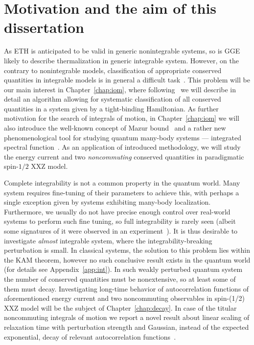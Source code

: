 \section{Motivation and the aim of this dissertation}
As ETH is anticipated to be valid in generic
nonintegrable systems, so is GGE likely to describe thermalization in generic integrable system.
However, on the contrary to nonintegrable models, classification of appropriate 
conserved quantities in integrable models is in general a difficult task~\autocite{DAlessio2016}.
This problem will be our main interest in Chapter~\ref{chap:iom}, where 
following~\textcite{Mierzejewski2015a} we will describe in detail an algorithm allowing for
systematic classification of all conserved quantities in a system given by a tight-binding
Hamiltonian. As further motivation for the search of integrals of motion, in
Chapter~\ref{chap:iom} we will also introduce the well-known concept of Mazur 
bound~\autocite{Mazur1969,Suzuki1971} and a rather new phenomenological tool for studying
quantum many-body systems --- integrated spectral function~\autocite{Vidmar2021}. 
As an application of introduced methodology, we will study the energy current and
two \textit{noncommuting} conserved quantities in paradigmatic spin-\(1/2\) XXZ model.


Complete integrability is not a common property in the quantum world.
Many system requires fine-tuning of their parameters to achieve this, with perhaps a single
exception given by systems exhibiting many-body localization. Furthermore, we usually
do not have precise enough control over real-world systems to perform such fine tuning,
so full integrability is rarely seen (albeit some signatures of it were 
observed in an experiment~\autocite{Khemani2019}). It is thus desirable to investigate
\emph{almost} integrable system, where the integrability-breaking perturbation is small.
In classical systems, the solution to this problem lies within the KAM theorem, however
no such conclusive result exists in the quantum world (for details see Appendix~\ref{app:int}).
In such weakly perturbed quantum system the number of conserved quantities must be nonextensive,
so at least some of them must decay. Investigating long-time behavior of autocorrelation functions of
aforementioned energy current and two noncommuting observables 
in spin-(1/2) XXZ model will be the subject of Chapter~\ref{chap:decay}. In case of
the titular noncommuting integrals of motion we report a novel
result about linear scaling of relaxation time with perturbation strength and Gaussian,
instead of the expected exponential, decay of relevant autocorrelation functions~\autocite{mierzejewski2021multiple}.
 
